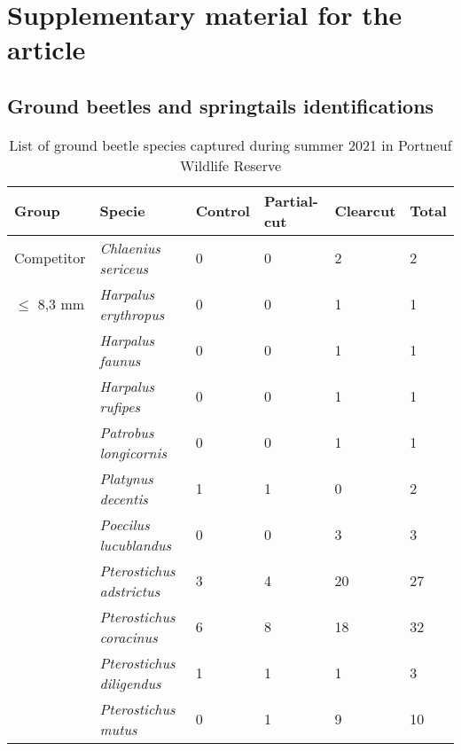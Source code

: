 \chapter{Supplementary material for the article}     %
\label{chap:supp}                   %

\clearpage

\section{Ground beetles and springtails identifications}

\begin{table}[h]
    \centering
    \caption[List of ground beetle species captured during summer 2021 in Portneuf Wildlife Reserve and classification between salamander's competitor and prey groups.]
    {List of ground beetle species captured during summer 2021 in Portneuf Wildlife Reserve}
    \label{tab:carabid}
    \begin{tabular}{llllll} 
        \hline
        Group & Specie & Control & Partial-cut & Clearcut & Total \\ [0.5ex] 
        \hline      
        Competitor          & \textit{Chlaenius sericeus}               & 0 & 0 & 2 & 2 \\  
        $\leq$ 8,3 mm       & \textit{Harpalus erythropus}              & 0 & 0 & 1 & 1 \\
                            & \textit{Harpalus faunus}                  & 0 & 0 & 1 & 1 \\
                            & \textit{Harpalus rufipes}                 & 0 & 0 & 1 & 1 \\
                            & \textit{Patrobus longicornis}             & 0 & 0 & 1 & 1 \\
                            & \textit{Platynus decentis}                & 1 & 1 & 0 & 2 \\
                            & \textit{Poecilus lucublandus}             & 0 & 0 & 3 & 3 \\
                            & \textit{Pterostichus adstrictus}          & 3 & 4 & 20 & 27 \\
                            & \textit{Pterostichus coracinus}           & 6 & 8 & 18 & 32 \\
                            & \textit{Pterostichus diligendus}          & 1 & 1 & 1 & 3 \\
                            & \textit{Pterostichus mutus}               & 0 & 1 & 9 & 10 \\

\end{tabular}
\end{table}
